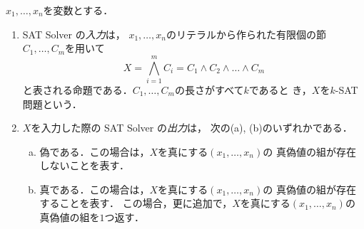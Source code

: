 \begin{defn}
 $x_1, \dots, x_n$を変数とする．
 \begin{enumerate}[1.]
  \item SAT Solver の\emph{入力}は，
        $x_1, \dots, x_n$のリテラルから作られた有限個の節
        $C_1, \dots, C_m$を用いて
        \[
        X = \bigwedge_{i=1}^m C_i = C_1 \land C_2 \land \dots \land C_m
        \]
        と表される命題である．$C_1, \dots, C_m$の長さがすべて$k$であると
        き，$X$を{\futoji $k$-SAT 問題}という．
  \item $X$を入力した際の SAT Solver の\emph{出力}は，
        次の(a), (b)のいずれかである．
        \begin{enumerate}[(a)]
         \item 偽である．この場合は，$X$を真にする$(x_1, \dots, x_n)$の
               真偽値の組が存在しないことを表す．
         \item 真である．この場合は，$X$を真にする$(x_1, \dots, x_n)$の
               真偽値の組が存在することを表す．
               この場合，更に追加で，$X$を真にする$(x_1, \dots, x_n)$の
               真偽値の組を$1$つ返す．
        \end{enumerate} 
 \end{enumerate}
\end{defn}


